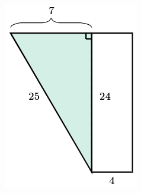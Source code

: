 \begin{solutionbox}{15cm}
\begin{minipage}{0.25\textwidth}
\begin{figure}[H]
        \end{figure}
        \begin{figure}[H]
            \centering
            \includegraphics[width=0.5\linewidth]{../images/area_compuesta_05c.png}
            \caption{}
            \label{fig:area_compuesta_05c}
        \end{figure}
    \end{minipage}

\end{solutionbox}